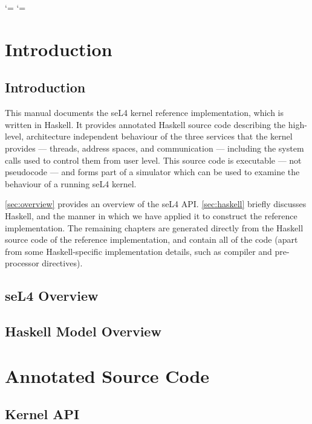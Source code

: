 \documentclass[a4paper,11pt,twoside]{report}
\begin{document}
  \cleardoublepage
  \setcounter{page}{1}
  
\catcode`\<=\active
\catcode`\>=\active


\part{Introduction}

\chapter{Introduction}

This manual documents the seL4 kernel reference implementation, which
is written in Haskell. It provides annotated Haskell source code
describing the high-level, architecture independent behaviour of the
three services that the kernel provides --- threads, address spaces,
and communication --- including the system calls used to control them
from user level. This source code is executable --- not pseudocode ---
and forms part of a simulator which can be used to examine the
behaviour of a running seL4 kernel.

\autoref{sec:overview} provides an overview of the seL4 API. \autoref{sec:haskell} briefly discusses Haskell, and the manner in which we have applied it to construct the reference implementation. The remaining chapters are generated directly from the Haskell source code of the reference implementation, and contain all of the code (apart from some Haskell-specific implementation details, such as compiler and pre-processor directives).

\chapter{seL4 Overview}\label{sec:overview}


\chapter{Haskell Model Overview}\label{sec:haskell}


\part{Annotated Source Code}

\chapter{Kernel API}\label{sec:api}
\end{document}
